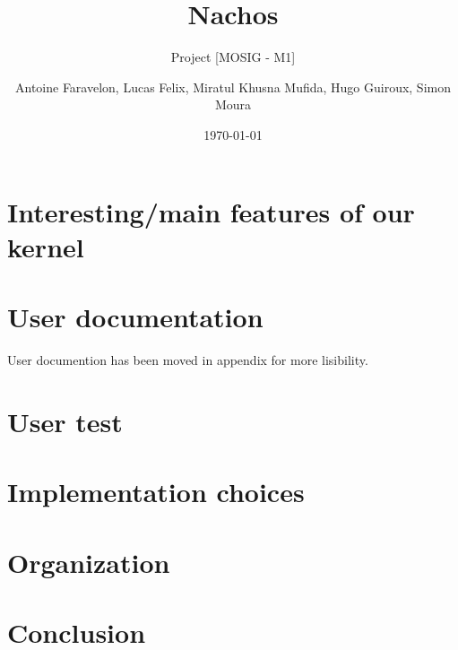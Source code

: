 \documentclass[a4paper,10pt]{article}
\title{Nachos}
\subtitle{Project [MOSIG - M1]}
\author{Antoine Faravelon, Lucas Felix, Miratul Khusna Mufida, Hugo Guiroux, Simon Moura}
\date{\today}
\begin{document}
\begin{titlepage}
  \maketitle
\thispagestyle{empty}
\tableofcontents
\end{titlepage}


\pagestyle{plain}
\setcounter{page}{1}
\section{Interesting/main features of our kernel}
    

\section{User documentation}
User documention has been moved in appendix for more lisibility.

\section{User test}
    
\section{Implementation choices}
    

\section{Organization}
    

\section{Conclusion}
    

\appendix
    
\end{document}
